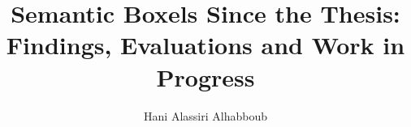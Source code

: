



\title{Semantic Boxels Since the Thesis:\texorpdfstring{\\}{ }Findings, Evaluations and Work in Progress}
\author{Hani Alassiri Alhabboub}
\date{}

\newcommand\reportkind{Internal Report}
\newcommand\reportcheckpoint{Checkpoint 1}
\newcommand\reportversion{Version 2.1}




  \frontmatter
  
  
  
  \tableofcontents

  \mainmatter
  
  
  
  
  
  
  
  

  \appendix
  
  

  \backmatter
  \listacronyms
  \listsymbols
  \listfigures
  \listtables
  \listalgorithms
  \listlistings
  \listreferences
  \listtodos


